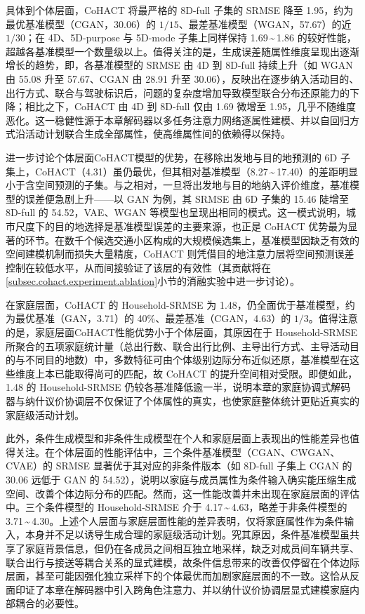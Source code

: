 具体到个体层面，CoHACT 将最严格的 8D-full 子集的 SRMSE 降至 1.95，约为最优基准模型（CGAN，30.06）的 $1/15$、最差基准模型（WGAN，57.67）的近 $1/30$；在 4D、5D-purpose 与 5D-mode 子集上同样保持 1.69\,\textasciitilde\,1.86 的较好性能，超越各基准模型一个数量级以上。值得关注的是，生成误差随属性维度呈现出逐渐增长的趋势，即，各基准模型的 SRMSE 由 4D 到 8D-full 持续上升（如 WGAN 由 55.08 升至 57.67、CGAN 由 28.91 升至 30.06），反映出在逐步纳入活动目的、出行方式、联合与驾驶标识后，问题的复杂度增加导致模型联合分布还原能力的下降；相比之下，CoHACT 由 4D 到 8D-full 仅由 1.69 微增至 1.95，几乎不随维度恶化。这一稳健性源于本章解码器以多任务注意力网络逐属性建模、并以自回归方式沿活动计划联合生成全部属性，使高维属性间的依赖得以保持。

进一步讨论个体层面CoHACT模型的优势，在移除出发地与目的地预测的 6D 子集上，CoHACT（4.31）虽仍最优，但其相对基准模型（8.27\,\textasciitilde\,17.40）的差距明显小于含空间预测的子集。与之相对，一旦将出发地与目的地纳入评价维度，基准模型的误差便急剧上升——以 GAN 为例，其 SRMSE 由 6D 子集的 15.46 陡增至 8D-full 的 54.52，VAE、WGAN 等模型也呈现出相同的模式。这一模式说明，城市尺度下的目的地选择是基准模型误差的主要来源，也正是 CoHACT 优势最为显著的环节。在数千个候选交通小区构成的大规模候选集上，基准模型因缺乏有效的空间建模机制而损失大量精度，CoHACT 则凭借目的地注意力层将空间预测误差控制在较低水平，从而间接验证了该层的有效性（其贡献将在\ref{subsec.cohact.experiment.ablation}小节的消融实验中进一步讨论）。

在家庭层面，CoHACT 的 Household-SRMSE 为 1.48，仍全面优于基准模型，约为最优基准（GAN，3.71）的 40\%、最差基准（CGAN，4.63）的 $1/3$。值得注意的是，家庭层面CoHACT性能优势小于个体层面，其原因在于 Household-SRMSE 所聚合的五项家庭统计量（总出行数、联合出行比例、主导出行方式、主导活动目的与不同目的地数）中，多数特征可由个体级别边际分布近似还原，基准模型在这些维度上本已能取得尚可的匹配，故 CoHACT 的提升空间相对受限。即便如此，1.48 的 Household-SRMSE 仍较各基准降低逾一半，说明本章的家庭协调式解码器与纳什议价协调层不仅保证了个体属性的真实，也使家庭整体统计更贴近真实的家庭级活动计划。

此外，条件生成模型和非条件生成模型在个人和家庭层面上表现出的性能差异也值得关注。在个体层面的性能评估中，三个条件基准模型（CGAN、CWGAN、CVAE）的 SRMSE 显著优于其对应的非条件版本（如 8D-full 子集上 CGAN 的 30.06 远低于 GAN 的 54.52），说明以家庭与成员属性为条件输入确实能压缩生成空间、改善个体边际分布的匹配。然而，这一性能改善并未出现在家庭层面的评估中。三个条件模型的 Household-SRMSE 介于 4.17\,\textasciitilde\,4.63，略差于非条件模型的 3.71\,\textasciitilde\,4.30。上述个人层面与家庭层面性能的差异表明，仅将家庭属性作为条件输入，本身并不足以诱导生成合理的家庭级活动计划。究其原因，条件基准模型虽共享了家庭背景信息，但仍在各成员之间相互独立地采样，缺乏对成员间车辆共享、联合出行与接送等耦合关系的显式建模，故条件信息带来的改善仅停留在个体边际层面，甚至可能因强化独立采样下的个体最优而加剧家庭层面的不一致。这恰从反面印证了本章在解码器中引入跨角色注意力、并以纳什议价协调层显式建模家庭内部耦合的必要性。

